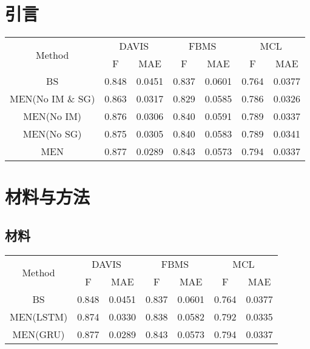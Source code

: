 \section{引言}
\blindtext
\begin{table}[]
\begin{tabular}{|c|c|c|c|c|c|c|}
\hline
\multirow{2}{*}{Method} & \multicolumn{2}{c|}{DAVIS} & \multicolumn{2}{c|}{FBMS} & \multicolumn{2}{c|}{MCL} \\ \cline{2-7} 
 & F & MAE & F & MAE & F & MAE \\ \hline
BS & 0.848 & 0.0451 & 0.837 & 0.0601 & 0.764 & 0.0377 \\ \hline
MEN(No IM \& SG) & 0.863 &  0.0317 & 0.829 & 0.0585 & 0.786 & 0.0326 \\ \hline
MEN(No IM) & 0.876 & 0.0306 & 0.840 & 0.0591 & 0.789 & 0.0337 \\ \hline
MEN(No SG) & 0.875 & 0.0305 & 0.840 & 0.0583 & 0.789 & 0.0341 \\ \hline
MEN & 0.877 & 0.0289 & 0.843 & 0.0573 & 0.794 & 0.0337 \\ \hline
\end{tabular}
\end{table}
\section{材料与方法}
\subsection{材料}
\Blindtext
\begin{table}[]
\begin{tabular}{|c|c|c|c|c|c|c|}
\hline
\multirow{2}{*}{Method} & \multicolumn{2}{c|}{DAVIS} & \multicolumn{2}{c|}{FBMS} & \multicolumn{2}{c|}{MCL} \\ \cline{2-7} 
 & F & MAE & F & MAE & F & MAE \\ \hline
BS & 0.848 & 0.0451 & 0.837 & 0.0601 & 0.764 & 0.0377 \\ \hline
MEN(LSTM) & 0.874 & 0.0330 & 0.838 & 0.0582 & 0.792 & 0.0335 \\ \hline
MEN(GRU) & 0.877 & 0.0289 & 0.843 & 0.0573 & 0.794 & 0.0337 \\ \hline
\end{tabular}
\end{table}
